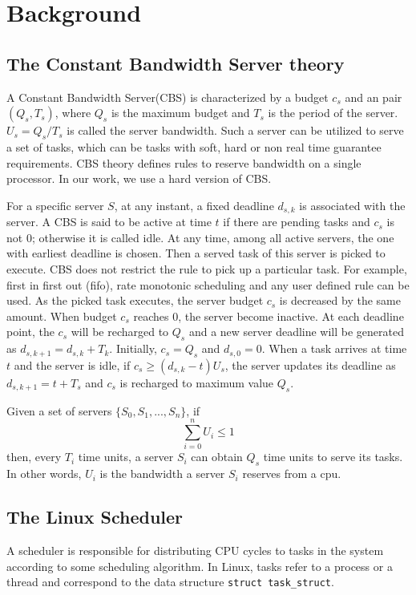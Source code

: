 \chapter{Background\label{chap:background}}
\section{The Constant Bandwidth Server theory\label{sec:CBS}}
A Constant Bandwidth Server(CBS) is characterized by a budget $c_s$ and
an pair $(Q_s, T_s)$, where $Q_s$ is the maximum budget and $T_s$
is the period of the server. $U_s = Q_s/T_s$ is called the server bandwidth.
Such a server can be utilized to serve a set of tasks, which can be 
tasks with soft, hard or non real time guarantee requirements. 
CBS theory defines rules to reserve bandwidth on a single processor.
In our work, we use a hard version of CBS.

For a specific server $S$, at any instant, a fixed deadline $d_{s,k}$ is 
associated with the server. A CBS is said to be active at time $t$ if there 
are pending tasks and $c_s$ is not 0; otherwise it is called idle. 
At any time, among all active servers,
the one with earliest deadline is chosen. Then a served task of this server 
is picked to execute. CBS does not restrict the rule to pick up a particular 
task. For example, first in first out (fifo), rate monotonic scheduling and
any user defined rule can be used.
As the picked task executes, the server budget $c_s$ is decreased by the 
same amount. When budget $c_s$ reaches 0, the server become inactive. At 
each deadline point, the $c_s$ will be recharged to $Q_s$ and a new server 
deadline will be generated as $d_{s, k+1} = d_{s,k} + T_k$. Initially, 
$c_s = Q_s$ and $d_{s, 0} = 0$. When a task arrives at time $t$ and the 
server is idle, if $c_s \ge (d_{s,k} - t)U_s$, the server updates its 
deadline as $d_{s, k+1} = t + T_s$ and $c_s$ is recharged to maximum 
value $Q_s$.

Given a set of servers $\{S_0, S_1, ... , S_n\}$, if
\[
	\sum_{i=0}^n U_i \le 1
\]
then, every $T_i$ time units, a server $S_i$ can obtain $Q_s$ time units 
to serve its tasks. In other words, $U_i$ is the bandwidth a server $S_i$
reserves from a cpu.

\section{The Linux Scheduler\label{sec:LinuxSched}}
A scheduler is responsible for distributing CPU cycles to tasks in the system
according to some scheduling algorithm. In Linux, tasks refer to a process or 
a thread and correspond to the data structure \texttt{struct task\_struct}.


